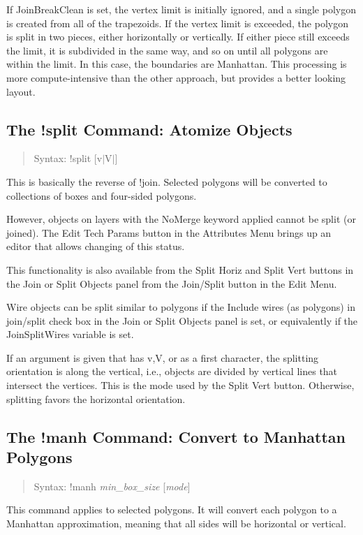 If {\et JoinBreakClean} is set, the vertex limit is initially ignored,
and a single polygon is created from all of the trapezoids.  If the
vertex limit is exceeded, the polygon is split in two pieces, either
horizontally or vertically.  If either piece still exceeds the limit,
it is subdivided in the same way, and so on until all polygons are
within the limit.  In this case, the boundaries are Manhattan.  This
processing is more compute-intensive than the other approach, but
provides a better looking layout.

\subsection{The {\cb !split} Command: Atomize Objects}
\begin{quote}
Syntax: {\vt !split} [{\vt v}$|${\vt V}$|${}]
\end{quote}
This is basically the reverse of {\cb !join}.  Selected polygons will
be converted to collections of boxes and four-sided polygons.

However, objects on layers with the {\vt NoMerge} keyword applied
cannot be split (or joined).  The {\cb Edit Tech Params} button in the
{\cb Attributes Menu} brings up an editor that allows changing of this
status.

This functionality is also available from the {\cb Split Horiz} and
{\cb Split Vert} buttons in the {\cb Join or Split Objects} panel from
the {\cb Join/Split} button in the {\cb Edit Menu}.

Wire objects can be split similar to polygons if the {\cb Include
wires (as polygons) in join/split} check box in the {\cb Join or Split
Objects} panel is set, or equivalently if the {\et JoinSplitWires}
variable is set.

If an argument is given that has {\vt v},{\vt V}, or {} as a
first character, the splitting orientation is along the vertical,
i.e., objects are divided by vertical lines that intersect the
vertices.  This is the mode used by the {\cb Split Vert} button. 
Otherwise, splitting favors the horizontal orientation.


\subsection{The {\cb !manh} Command: Convert to Manhattan Polygons}
\begin{quote}
Syntax: {\vt !manh} {\it min\_box\_size} [{\it mode\/}]
\end{quote}
This command applies to selected polygons.  It will convert each
polygon to a Manhattan approximation, meaning that all sides will be
horizontal or vertical.

